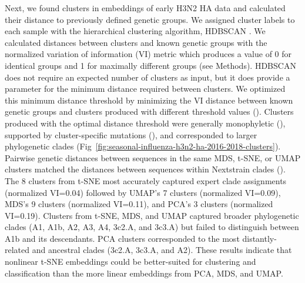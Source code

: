 \documentclass[10pt,letterpaper]{article}
\begin{document}
Next, we found clusters in embeddings of early H3N2 HA data and calculated their distance to previously defined genetic groups.
We assigned cluster labels to each sample with the hierarchical clustering algorithm, HDBSCAN \cite{campello2015hierarchical}.
We calculated distances between clusters and known genetic groups with the normalized variation of information (VI) metric \cite{meilua2003comparing} which produces a value of 0 for identical groups and 1 for maximally different groups (see Methods).
HDBSCAN does not require an expected number of clusters as input, but it does provide a parameter for the minimum distance required between clusters.
We optimized this minimum distance threshold by minimizing the VI distance between known genetic groups and clusters produced with different threshold values ().
Clusters produced with the optimal distance threshold were generally monophyletic (), supported by cluster-specific mutations (), and corresponded to larger phylogenetic clades (Fig~\ref{fig:seasonal-influenza-h3n2-ha-2016-2018-clusters}).
Pairwise genetic distances between sequences in the same MDS, t-SNE, or UMAP clusters matched the distances between sequences within Nextstrain clades ().
The 8 clusters from t-SNE most accurately captured expert clade assignments (normalized VI=0.04) followed by UMAP's 7 clusters (normalized VI=0.09), MDS's 9 clusters (normalized VI=0.11), and PCA's 3 clusters (normalized VI=0.19).
Clusters from t-SNE, MDS, and UMAP captured broader phylogenetic clades (A1, A1b, A2, A3, A4, 3c2.A, and 3c3.A) but failed to distinguish between A1b and its descendants.
PCA clusters corresponded to the most distantly-related and ancestral clades (3c2.A, 3c3.A, and A2).
These results indicate that nonlinear t-SNE embeddings could be better-suited for clustering and classification than the more linear embeddings from PCA, MDS, and UMAP.
\end{document}
